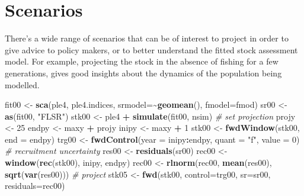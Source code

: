 \documentclass[
]{book}
\newenvironment{Shaded}{\begin{snugshade}}{\end{snugshade}}
\newcommand{\AttributeTok}[1]{\textcolor[rgb]{0.13,0.29,0.53}{#1}}
\newcommand{\CommentTok}[1]{\textcolor[rgb]{0.56,0.35,0.01}{\textit{#1}}}
\newcommand{\DecValTok}[1]{\textcolor[rgb]{0.00,0.00,0.81}{#1}}
\newcommand{\FunctionTok}[1]{\textcolor[rgb]{0.13,0.29,0.53}{\textbf{#1}}}
\newcommand{\NormalTok}[1]{#1}
\newcommand{\OtherTok}[1]{\textcolor[rgb]{0.56,0.35,0.01}{#1}}
\newcommand{\SpecialCharTok}[1]{\textcolor[rgb]{0.81,0.36,0.00}{\textbf{#1}}}
\newcommand{\StringTok}[1]{\textcolor[rgb]{0.31,0.60,0.02}{#1}}
\begin{document}
\hypertarget{scenarios}{%
\section{Scenarios}\label{scenarios}}

There's a wide range of scenarios that can be of interest to project in order to give advice to policy makers, or to better understand the fitted stock assessment model. For example, projecting the stock in the absence of fishing for a few generations, gives good insights about the dynamics of the population being modelled.

\begin{Shaded}
\begin{Highlighting}[]
\NormalTok{fit00 }\OtherTok{\textless{}{-}} \FunctionTok{sca}\NormalTok{(ple4, ple4.indices, }\AttributeTok{srmodel=}\SpecialCharTok{\textasciitilde{}}\FunctionTok{geomean}\NormalTok{(), }\AttributeTok{fmodel=}\NormalTok{fmod)}
\NormalTok{sr00 }\OtherTok{\textless{}{-}} \FunctionTok{as}\NormalTok{(fit00, }\StringTok{"FLSR"}\NormalTok{)}
\NormalTok{stk00 }\OtherTok{\textless{}{-}}\NormalTok{ ple4 }\SpecialCharTok{+} \FunctionTok{simulate}\NormalTok{(fit00, nsim)}
\CommentTok{\# set projection}
\NormalTok{projy }\OtherTok{\textless{}{-}} \DecValTok{25}
\NormalTok{endpy }\OtherTok{\textless{}{-}}\NormalTok{ maxy }\SpecialCharTok{+}\NormalTok{ projy}
\NormalTok{inipy }\OtherTok{\textless{}{-}}\NormalTok{ maxy }\SpecialCharTok{+} \DecValTok{1}
\NormalTok{stk00 }\OtherTok{\textless{}{-}} \FunctionTok{fwdWindow}\NormalTok{(stk00, }\AttributeTok{end =}\NormalTok{ endpy)}
\NormalTok{trg00 }\OtherTok{\textless{}{-}} \FunctionTok{fwdControl}\NormalTok{(}\AttributeTok{year =}\NormalTok{ inipy}\SpecialCharTok{:}\NormalTok{endpy, }\AttributeTok{quant =} \StringTok{"f"}\NormalTok{, }\AttributeTok{value =} \DecValTok{0}\NormalTok{)}
\CommentTok{\# recruitment uncertainty}
\NormalTok{res00 }\OtherTok{\textless{}{-}} \FunctionTok{residuals}\NormalTok{(sr00)}
\NormalTok{rec00 }\OtherTok{\textless{}{-}} \FunctionTok{window}\NormalTok{(}\FunctionTok{rec}\NormalTok{(stk00), inipy, endpy)}
\NormalTok{rec00 }\OtherTok{\textless{}{-}} \FunctionTok{rlnorm}\NormalTok{(rec00, }\FunctionTok{mean}\NormalTok{(res00), }\FunctionTok{sqrt}\NormalTok{(}\FunctionTok{var}\NormalTok{(res00)))}
\CommentTok{\# project}
\NormalTok{stk05 }\OtherTok{\textless{}{-}} \FunctionTok{fwd}\NormalTok{(stk00, }\AttributeTok{control=}\NormalTok{trg00, }\AttributeTok{sr=}\NormalTok{sr00, }\AttributeTok{residuals=}\NormalTok{rec00)}
\end{Highlighting}
\end{Shaded}
\end{document}
